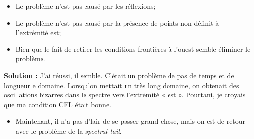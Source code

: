 \documentclass[10pt]{article}
\numberwithin{equation}{section}
\begin{document}
\begin{itemize}
\item Le problème n'est pas causé par les réflexions;
\item Le problème n'est pas causé par la présence de points non-définit à l'extrémité est;
\item Bien que le fait de retirer les conditions frontières à l'ouest semble éliminer le problème.
\end{itemize}

\textbf{Solution :} J'ai réussi, il semble. C'était un problème de pas de temps et de longueur e domaine. Lorsqu'on mettait un très long domaine, on obtenait des oscillations bizarres dans le spectre vers l'extrémité « est ». Pourtant, je croyais que ma condition CFL était bonne.

\begin{itemize}
\item Maintenant, il n'a pas d'lair de se passer grand chose, mais on est de retour avec le problème de la \emph{spectral tail}.
\end{itemize}

\printbibliography
\end{document}

